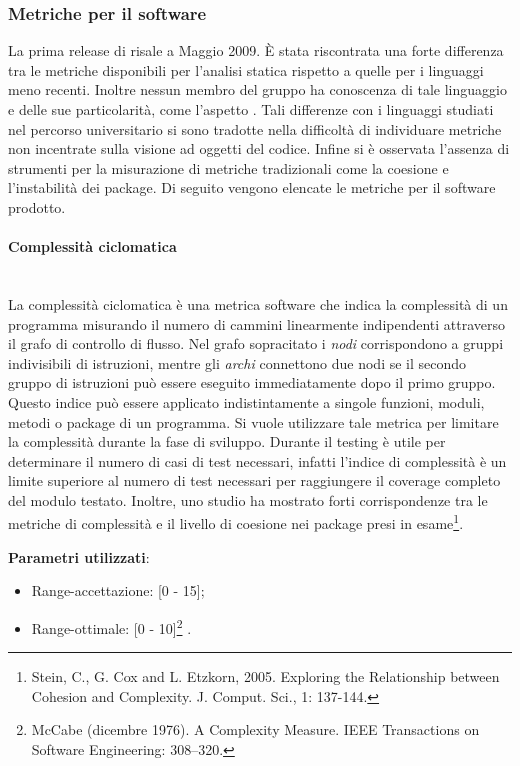 		\subsubsection{Metriche per il software}

		La prima release di  risale a Maggio 2009. È stata riscontrata una forte differenza tra le metriche disponibili per l'analisi statica rispetto a quelle per i linguaggi meno recenti. Inoltre nessun membro del gruppo ha conoscenza di tale linguaggio e delle sue particolarità, come l'aspetto . Tali differenze con i linguaggi studiati nel percorso universitario si sono tradotte nella difficoltà di individuare metriche non incentrate sulla visione ad oggetti del codice. Infine si è osservata l'assenza di strumenti per la misurazione di metriche tradizionali come la coesione e l'instabilità dei package.
		Di seguito vengono elencate le metriche per il software prodotto.
		
			\paragraph{Complessità ciclomatica}\mbox{} \\
				
			La complessità ciclomatica è una metrica software che indica la complessità di un programma misurando il numero di cammini linearmente indipendenti attraverso il grafo di controllo di flusso. Nel grafo sopracitato i \emph{nodi} corrispondono a gruppi indivisibili di istruzioni, mentre gli \emph{archi} connettono due nodi se il secondo gruppo di istruzioni può essere eseguito immediatamente dopo il primo gruppo.
			Questo indice può essere applicato indistintamente a singole funzioni, moduli, metodi o package di un programma.
			Si vuole utilizzare tale metrica per limitare la complessità durante la fase di sviluppo.
			Durante il testing è utile per determinare il numero di casi di test necessari, infatti l'indice di complessità è un limite superiore al numero di test necessari per raggiungere il coverage completo del modulo testato. Inoltre, uno studio ha mostrato forti corrispondenze tra le metriche di complessità e il livello di coesione nei package presi in esame\footnote{Stein, C., G. Cox and L. Etzkorn, 2005. Exploring the Relationship between Cohesion and Complexity. J. Comput. Sci., 1: 137-144.}.
			
			\textbf{Parametri utilizzati}:
			\begin{itemize}
				\item Range-accettazione: [0 - 15];
				\item Range-ottimale: [0 - 10]\footnote{McCabe (dicembre 1976). A Complexity Measure. IEEE Transactions on Software Engineering: 308–320.} .
			\end{itemize}


